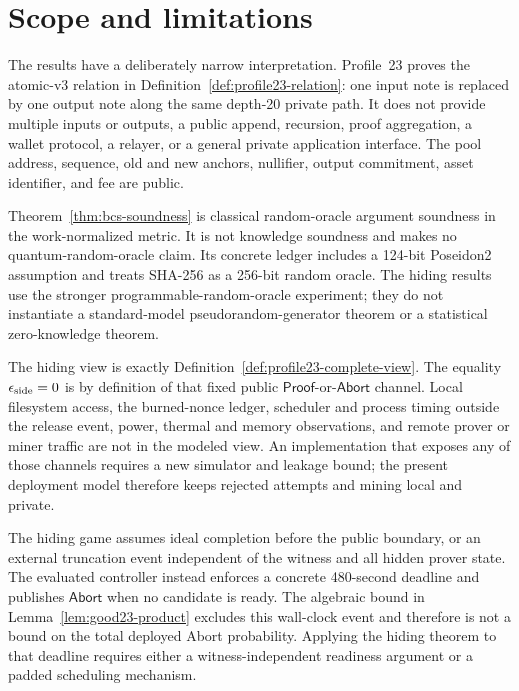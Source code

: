 \section{Scope and limitations}
\label{sec:limitations}

The results have a deliberately narrow interpretation.  Profile~23 proves the
atomic-v3 relation in Definition~\ref{def:profile23-relation}: one input note
is replaced by one output note along the same depth-20 private path.  It does
not provide multiple inputs or outputs, a public append, recursion, proof
aggregation, a wallet protocol, a relayer, or a general private application
interface.  The pool address, sequence, old and new anchors, nullifier, output
commitment, asset identifier, and fee are public.

Theorem~\ref{thm:bcs-soundness} is classical random-oracle argument soundness
in the work-normalized metric.  It is not knowledge soundness and makes no
quantum-random-oracle claim.  Its concrete ledger includes a 124-bit
Poseidon2 assumption and treats SHA-256 as a 256-bit random oracle.  The
hiding results use the stronger programmable-random-oracle experiment; they
do not instantiate a standard-model pseudorandom-generator theorem or a
statistical zero-knowledge theorem.

The hiding view is exactly Definition~\ref{def:profile23-complete-view}.  The
equality \(\epsilon_{\rm side}=0\) is by definition of that fixed public
\(\mathsf{Proof}\)-or-\(\mathsf{Abort}\) channel.  Local filesystem access,
the burned-nonce ledger, scheduler and process timing outside the release
event, power, thermal and memory observations, and remote prover or miner
traffic are not in the modeled view.  An implementation that exposes any of
those channels requires a new simulator and leakage bound; the present
deployment model therefore keeps rejected attempts and mining local and
private.

The hiding game assumes ideal completion before the public boundary, or an
external truncation event independent of the witness and all hidden prover
state.  The evaluated controller instead enforces a concrete 480-second
deadline and publishes \(\mathsf{Abort}\) when no candidate is ready.  The
algebraic bound in Lemma~\ref{lem:good23-product} excludes this wall-clock
event and therefore is not a bound on the total deployed Abort probability.
Applying the hiding theorem to that deadline requires either a
witness-independent readiness argument or a padded scheduling mechanism.

